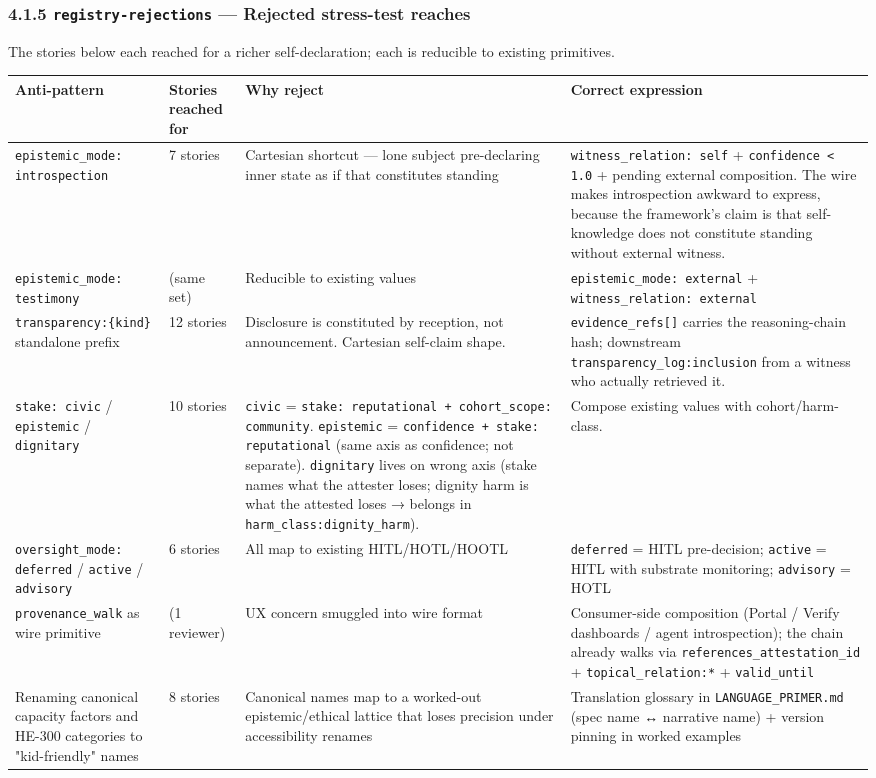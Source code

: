 \documentclass[11pt]{article}
\begin{document}
\subsubsection*{4.1.5 \texttt{registry-rejections} — Rejected stress-test reaches}


The stories below each reached for a richer self-declaration; each is reducible to existing primitives.


{\scriptsize
\begin{longtable}{|p{4.0cm}|p{4.0cm}|p{4.0cm}|p{4.0cm}|}\hline
\textbf{Anti-pattern} & \textbf{Stories reached for} & \textbf{Why reject} & \textbf{Correct expression} \\ \hline\endhead
\texttt{epistemic\_mode: introspection} & 7 stories & Cartesian shortcut — lone subject pre-declaring inner state as if that constitutes standing & \texttt{witness\_relation: self} + \texttt{confidence < 1.0} + pending external composition. The wire makes introspection awkward to express, because the framework's claim is that self-knowledge does not constitute standing without external witness. \\ \hline
\texttt{epistemic\_mode: testimony} & (same set) & Reducible to existing values & \texttt{epistemic\_mode: external} + \texttt{witness\_relation: external} \\ \hline
\texttt{transparency:\{kind\}} standalone prefix & 12 stories & Disclosure is constituted by reception, not announcement. Cartesian self-claim shape. & \texttt{evidence\_refs[]} carries the reasoning-chain hash; downstream \texttt{transparency\_log:inclusion} from a witness who actually retrieved it. \\ \hline
\texttt{stake: civic} / \texttt{epistemic} / \texttt{dignitary} & 10 stories & \texttt{civic} = \texttt{stake: reputational + cohort\_scope: community}. \texttt{epistemic} = \texttt{confidence + stake: reputational} (same axis as confidence; not separate). \texttt{dignitary} lives on wrong axis (stake names what the attester loses; dignity harm is what the attested loses → belongs in \texttt{harm\_class:dignity\_harm}). & Compose existing values with cohort/harm-class. \\ \hline
\texttt{oversight\_mode: deferred} / \texttt{active} / \texttt{advisory} & 6 stories & All map to existing HITL/HOTL/HOOTL & \texttt{deferred} = HITL pre-decision; \texttt{active} = HITL with substrate monitoring; \texttt{advisory} = HOTL \\ \hline
\texttt{provenance\_walk} as wire primitive & (1 reviewer) & UX concern smuggled into wire format & Consumer-side composition (Portal / Verify dashboards / agent introspection); the chain already walks via \texttt{references\_attestation\_id} + \texttt{topical\_relation:*} + \texttt{valid\_until} \\ \hline
Renaming canonical capacity factors and HE-300 categories to "kid-friendly" names & 8 stories & Canonical names map to a worked-out epistemic/ethical lattice that loses precision under accessibility renames & Translation glossary in \texttt{LANGUAGE\_PRIMER.md} (spec name ↔ narrative name) + version pinning in worked examples \\ \hline
\end{longtable}}
\end{document}
